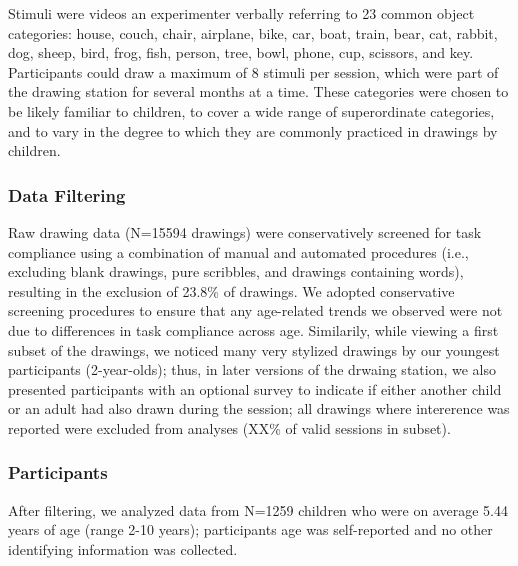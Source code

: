 \documentclass[10pt, letterpaper]{article}
\begin{document}
Stimuli were videos an experimenter verbally referring to 23 common
object categories: house, couch, chair, airplane, bike, car, boat,
train, bear, cat, rabbit, dog, sheep, bird, frog, fish, person, tree,
bowl, phone, cup, scissors, and key. Participants could draw a maximum
of 8 stimuli per session, which were part of the drawing station for
several months at a time. These categories were chosen to be likely
familiar to children, to cover a wide range of superordinate categories,
and to vary in the degree to which they are commonly practiced in
drawings by children.

\subsubsection{Data Filtering}\label{data-filtering}

Raw drawing data (N=15594 drawings) were conservatively screened for
task compliance using a combination of manual and automated procedures
(i.e., excluding blank drawings, pure scribbles, and drawings containing
words), resulting in the exclusion of 23.8\% of drawings. We adopted
conservative screening procedures to ensure that any age-related trends
we observed were not due to differences in task compliance across age.
Similarily, while viewing a first subset of the drawings, we noticed
many very stylized drawings by our youngest participants (2-year-olds);
thus, in later versions of the drwaing station, we also presented
participants with an optional survey to indicate if either another child
or an adult had also drawn during the session; all drawings where
intererence was reported were excluded from analyses (XX\% of valid
sessions in subset).

\subsubsection{Participants}\label{participants}

After filtering, we analyzed data from N=1259 children who were on
average 5.44 years of age (range 2-10 years); participants age was
self-reported and no other identifying information was collected.
\end{document}
